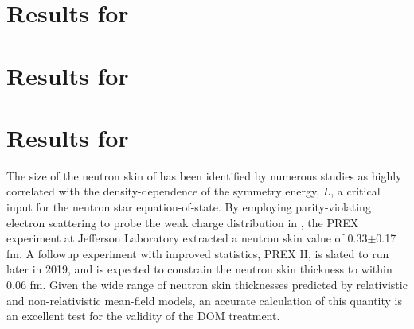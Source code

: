 %
%
%
%
%



\section{Results for \niEightFour}

\section{Results for \snTwelveFour}

\section{Results for \pbEight}
The size of the neutron skin of \pbEight has been identified by numerous studies as highly
correlated with the density-dependence of the symmetry energy, $L$, a critical input for the neutron
star equation-of-state. By employing parity-violating electron scattering to probe the
weak charge distribution in \pbEight, the PREX experiment at Jefferson Laboratory extracted a
\pbEight neutron skin value of 0.33$\pm$0.17 fm. A followup experiment with improved statistics, PREX II,
is slated to run later in 2019, and is expected to constrain the \pbEight neutron skin thickness to
within 0.06 fm. Given the wide range of \pbEight neutron skin thicknesses predicted by relativistic
and non-relativistic mean-field models, an accurate calculation of this quantity is an excellent
test for the validity of the DOM treatment.

